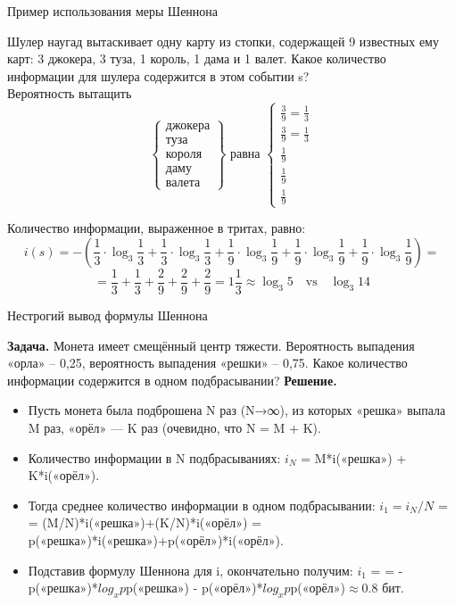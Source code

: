 \documentclass{beamer}
\begin{document}
\begin{frame}
    \begin{flushright}
        Пример использования меры Шеннона
    \end{flushright}
    Шулер наугад вытаскивает одну карту из стопки, содержащей 9 известных ему карт: 3
    джокера, 3 туза, 1 король, 1 дама и 1 валет. Какое количество информации для шулера
    содержится в этом событии s? \\
    
    Вероятность вытащить \[
    \left\{
    \begin{array}{ll}
    \text{джокера} \\
    \text{туза} \\
    \text{короля} \\
    \text{даму} \\
    \text{валета}
    \end{array}
    \right\}
    \text{ равна }
    \left\{
    \begin{array}{ll}
    \frac{3}{9} = \frac{1}{3} \\
    \frac{3}{9} = \frac{1}{3} \\
    \frac{1}{9} \\
    \frac{1}{9} \\
    \frac{1}{9}
    \end{array}
    \right.
    \]
    
    Количество информации, выраженное в тритах, равно:
    \[
    i(s) = -\left(
    \frac{1}{3} \cdot \log_3 \frac{1}{3} 
    + \frac{1}{3} \cdot \log_3 \frac{1}{3} 
    + \frac{1}{9} \cdot \log_3 \frac{1}{9} 
    + \frac{1}{9} \cdot \log_3 \frac{1}{9} 
    + \frac{1}{9} \cdot \log_3 \frac{1}{9}
    \right) =
    \]
    \[
    = \frac{1}{3} + \frac{1}{3} + \frac{2}{9} + \frac{2}{9} + \frac{2}{9} = 1 \frac{1}{3} \approx \log_3 5 \quad \text{vs} \quad \log_3 14
    \] 
\end{frame}
\begin{frame}
    \begin{flushright}
        Нестрогий вывод формулы Шеннона
    \end{flushright}
    \textbf{Задача.} Монета имеет смещённый центр тяжести. Вероятность выпадения «орла» – 0,25, вероятность выпадения «решки» – 0,75. Какое количество информации содержится в одном подбрасывании? 
    \textbf{Решение.}
    \begin{itemize}
        \item Пусть монета была подброшена N раз (N→∞), из которых «решка» выпала M раз, «орёл» — K раз (очевидно, что N = M + K). 
        \item Количество информации в N подбрасываниях: $i_N$ = M*i(«решка») + K*i(«орёл»). 
        \item Тогда среднее количество информации в одном подбрасывании: $i_1=i_N/N$ = = (M/N)*i(«решка»)+(K/N)*i(«орёл») = p(«решка»)*i(«решка»)+p(«орёл»)*i(«орёл»).
        \item Подставив формулу Шеннона для i, окончательно получим: $i_1$ = = -p(«решка»)*$log_x p$p(«решка») - p(«орёл»)*$log_x p$p(«орёл»)$\approx 0.8$ бит.
    \end{itemize}
\end{frame}
\end{document}
